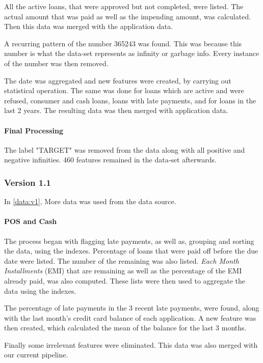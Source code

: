 \documentclass[sigconf, nonacm]{acmart}
\begin{document}
All the active loans, that were approved but not completed, were listed. The actual amount that was paid as well as the impending amount, was calculated. Then this data was merged with the application data.

A recurring pattern of the number 365243 was found. This was because this number is what the data-set represents as infinity or garbage info. Every instance of the number was then removed.

The date was aggregated and new features were created, by carrying out statistical operation. The same was done for loans which are active and were refused, consumer and cash loans, loans with late payments, and for loans in the last 2 years. The resulting data was then merged with application data.

\paragraph{Final Processing}

The label "TARGET" was removed from the data along with all positive and negative infinities. 460 features remained in the data-set afterwards.

\subsubsection{Version 1.1}\label{data:v1.1}

In \ref{data:v1}, More data was used from the data source.

\paragraph{POS and Cash}

The process began with flagging late payments, as well as, grouping and sorting the data, using the indexes. Percentage of loans that were paid off before the due date were listed. The number of the remaining was also listed.  
\emph{Each Month Installments} (EMI) that are remaining as well as the percentage of the EMI already paid, was also computed. These lists were then used to aggregate the data using the indexes.

The percentage of late payments in the 3 recent late payments, were found, along with the last month's credit card balance of each application. A new feature was then created, which calculated the mean of the balance for the last 3 months.

Finally some irrelevant features were eliminated. This data was also merged with our current pipeline.
\end{document}
